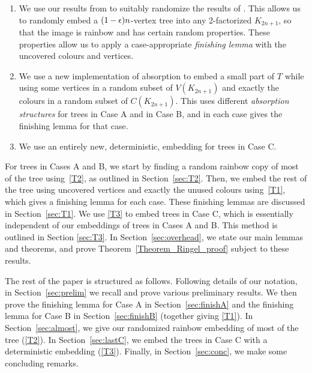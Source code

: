 \begin{enumerate}[label = {\bfseries M\arabic{enumi}}]

\item We use our results from \cite{montgomery2018decompositions} to suitably randomize the results of \cite{MPS}. This allows us to randomly embed a $(1-\epsilon)n$-vertex tree into any 2-factorized $K_{2n+1}$, so that the image is rainbow and has certain random properties. These properties allow us to apply a case-appropriate \emph{finishing lemma} with the uncovered colours and vertices.\label{T2}
\item We use a new implementation of absorption to embed a small part of $T$ while using some vertices in a random subset of $V(K_{2n+1})$ and exactly the colours in a random subset of $C(K_{2n+1})$. This uses different \emph{absorption structures} for trees in Case A and in Case B, and in each case gives the finishing lemma for that case.\label{T1}
\item We use an entirely new, deterministic, embedding for trees in Case C.\label{T3}
\end{enumerate}

 For trees in Cases A and B, we start by finding a random rainbow copy of most of the tree using~\ref{T2}, as outlined in Section~\ref{sec:T2}. Then, we embed the rest of the tree using uncovered vertices and exactly the unused colours using~\ref{T1}, which gives a finishing lemma for each case. These finishing lemmas are discussed in Section~\ref{sec:T1}. We use \ref{T3} to embed trees in Case C, which is essentially independent of our embeddings of trees in Cases A and B. This method is outlined in Section \ref{sec:T3}. In Section~\ref{sec:overhead}, we state our main lemmas and theorems, and prove Theorem~\ref{Theorem_Ringel_proof} subject to these results.

The rest of the paper is structured as follows. Following details of our notation, in Section~\ref{sec:prelim} we recall and prove various preliminary results.  We then prove the finishing lemma for Case A in Section~\ref{sec:finishA} and the finishing lemma for Case B in Section~\ref{sec:finishB} (together giving \ref{T1}). In Section~\ref{sec:almost}, we give our randomized rainbow embedding of most of the tree (\ref{T2}). In Section~\ref{sec:lastC}, we embed the trees in Case C with a deterministic embedding (\ref{T3}). Finally, in Section~\ref{sec:conc}, we make some concluding remarks.


